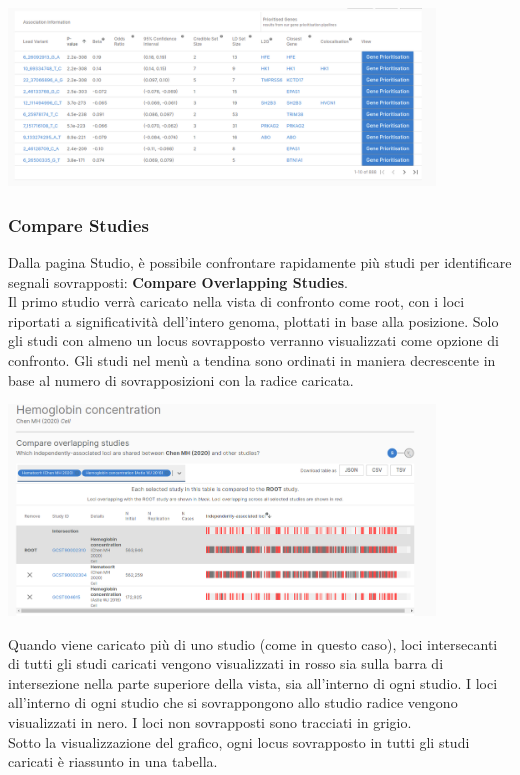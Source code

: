 \documentclass{article}
\begin{document}
\begin{center}
    \includegraphics[width=0.85\textwidth]{figures/6-Study.png}
\end{center}
\subsubsection{Compare Studies}
Dalla pagina Studio, è possibile confrontare rapidamente più studi per identificare segnali sovrapposti: \textbf{Compare Overlapping Studies}.\\
Il primo studio verrà caricato nella vista di confronto come root, con i loci riportati a significatività dell'intero genoma, plottati in base alla posizione. Solo gli studi con almeno un locus sovrapposto verranno visualizzati come opzione di confronto. Gli studi nel menù a tendina sono ordinati in maniera decrescente in base al numero di sovrapposizioni con la radice caricata.
\begin{center}
    \includegraphics[width=0.85\textwidth]{figures/7-Compare Studies.png}
\end{center}
Quando viene caricato più di uno studio (come in questo caso), loci intersecanti di tutti gli studi caricati vengono visualizzati in rosso sia sulla barra di intersezione nella parte superiore della vista, sia all'interno di ogni studio. I loci all'interno di ogni studio che si sovrappongono allo studio radice vengono visualizzati in nero. I loci non sovrapposti sono tracciati in grigio.\\
Sotto la visualizzazione del grafico, ogni locus sovrapposto in tutti gli studi caricati è riassunto in una tabella.
\end{document}
